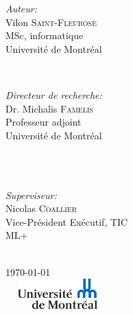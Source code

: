 \documentclass[9pt, french]{article}
\begin{document}
\begin{titlepage}
		\begin{minipage}{0.4\textwidth}
			\begin{flushleft} \large
				\emph{Auteur:}\\
				Vilon \textsc{Saint-Fleurose} %
				\\MSc, informatique \\Université de Montréal
			\end{flushleft}
		\end{minipage}
		~
		\begin{minipage}{0.4\textwidth}
			\begin{flushright} \large
				\emph{Directeur de recherche:} \\
				Dr. Michalis \textsc{Famelis} %
				\\Professeur adjoint \\Université de Montréal
			\end{flushright}
		\end{minipage}\\[2cm]
			~
			\begin{minipage}{0.4\textwidth}
				\begin{center} \large
					\emph{Superviseur:} \\
					 Nicolas \textsc{Coallier} %
					\\Vice-Président Exécutif, TIC \\ML+
				\end{center}
			\end{minipage}\\[2cm]
		
		
		
		{\large \today}\\[2cm] %
		
		
		\includegraphics[width=4cm, height=1.2cm]{logo.png} %
		
		
		\vfill %
		
	\end{titlepage}
	
\end{document}
